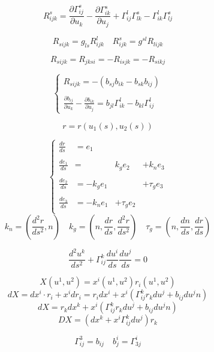 \documentclass[12pt,a4paper]{article}
\begin{document}
\[
R^s_{ijk} = \frac{\partial\Gamma^s_{ij}}{\partial u_k} - \frac{\partial\Gamma^s_{ik}}{\partial u_j} + \Gamma^l_{ij}\Gamma^s_{lk} - \Gamma^l_{ik}\Gamma^s_{lj}
\]

\[
R_{sijk} = g_{ls}R^l_{ijk} \quad R^s_{ijk} = g^{sl}R_{lijk}
\]

\[
R_{sijk} = R_{jksi} = -R_{isjk} = -R_{sikj}
\]

\[
\begin{cases}
R_{sijk} = -(b_{sj}b_{ik} - b_{sk}b_{ij}) \\
\\
\displaystyle \frac{\partial b_{ij}}{\partial u_k} - \frac{\partial b_{ik}}{\partial u_j} = b_{jl} \Gamma^l_{ik} - b_{kl}\Gamma^l_{ij}
\end{cases}
\]

\[
r = r(u_1(s),u_2(s))
\]

\[
\left\{
\begin{array}{llll}
\displaystyle \frac{dr}{ds} &= e_1 && \\
\\
\displaystyle \frac{de_1}{ds} &= &k_ge_2&+k_ne_3 \\
\\
\displaystyle \frac{de_2}{ds} &=-k_ge_1 & &+\tau_ge_3 \\
\\
\displaystyle \frac{de_3}{ds} &= -k_ne_1&+\tau_ge_2& \\
\end{array}
\right.
\]
\[
k_n  =( \frac{d^2r}{ds^2} ,n) \quad k_g = (n,\frac{dr}{ds},\frac{d^2r}{ds^2}) \quad \tau_g = (n,\frac{dn}{ds},\frac{dr}{ds})
\]

\[
\frac{d^2u^k}{ds^2} + \Gamma^k_{ij} \frac{du^i}{ds}\frac{du^j}{ds} = 0
\]

\[
X(u^1,u^2) = x^i(u^1,u^2)r_i(u^1,u^2)
\]
\[
dX = dx^i \cdot r_i + x^i dr_i = r_idx^i + x^i(\Gamma^k_{ij}r_kdu^j + b_{ij}du^jn)
\]
\[
dX = r_kdx^k + x^i(\Gamma^k_{ij}r_kdu^j + b_{ij}du^jn)
\]
\[
DX =(dx^k + x^i\Gamma^k_{ij}du^j)r_k
\]

\[
\Gamma^3_{ij} = b_{ij} \quad b^i_j = \Gamma^i_{3j}
\]
\end{document}
